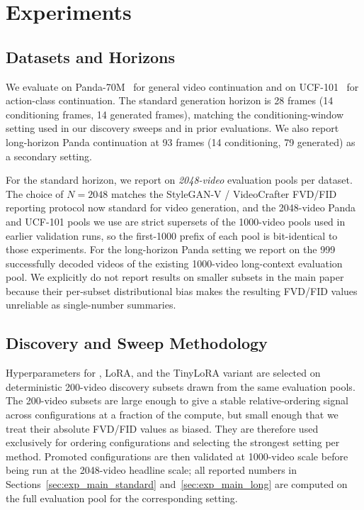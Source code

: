 \section{Experiments}
\label{sec:experiments}

\subsection{Datasets and Horizons}
\label{sec:exp_datasets}

We evaluate on Panda-70M~\citep{chen2024panda70m} for general video
continuation and on UCF-101~\citep{soomro2012ucf101} for action-class
continuation. The standard generation horizon is 28 frames (14 conditioning
frames, 14 generated frames), matching the conditioning-window setting used
in our discovery sweeps and in prior \backbone evaluations. We also report
long-horizon Panda continuation at 93 frames (14 conditioning, 79 generated)
as a secondary setting.

For the standard horizon, we report on \emph{2048-video} evaluation pools
per dataset. The choice of $N=2048$ matches the StyleGAN-V / VideoCrafter
FVD/FID reporting protocol now standard for video generation, and the
2048-video Panda and UCF-101 pools we use are strict supersets of the
1000-video pools used in earlier validation runs, so the first-1000 prefix
of each pool is bit-identical to those experiments. For the long-horizon
Panda setting we report on the 999 successfully decoded videos of the
existing 1000-video long-context evaluation pool. We explicitly do not
report results on smaller subsets in the main paper because their per-subset
distributional bias makes the resulting FVD/FID values unreliable as
single-number summaries.

\subsection{Discovery and Sweep Methodology}
\label{sec:exp_discovery}

Hyperparameters for \method, LoRA, and the TinyLoRA variant are selected on
deterministic 200-video discovery subsets drawn from the same evaluation
pools. The 200-video subsets are large enough to give a stable
relative-ordering signal across configurations at a fraction of the
compute, but small enough that we treat their absolute FVD/FID values as
biased. They are therefore used exclusively for ordering configurations and
selecting the strongest setting per method. Promoted configurations are
then validated at 1000-video scale before being run at the 2048-video
headline scale; all reported numbers in
Sections~\ref{sec:exp_main_standard} and~\ref{sec:exp_main_long} are
computed on the full evaluation pool for the corresponding setting.

